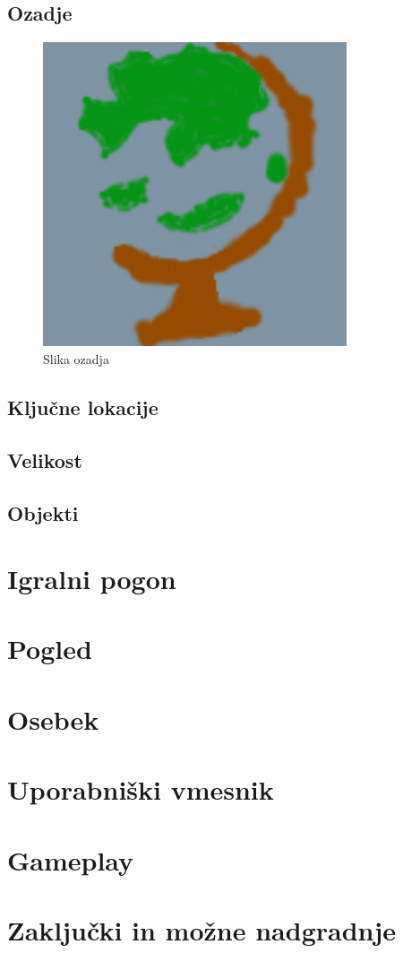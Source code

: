 \documentclass[a4paper,12pt]{article}
\begin{document}
\subsection{Ozadje}
\begin{figure}[h!]
    \centering
    \includegraphics[width=0.8\textwidth]{./slika.png}
    \caption{Slika ozadja}
    \label{fig:ozadje}
\end{figure}

\subsection{Klju\v{c}ne lokacije}

\subsection{Velikost}

\subsection{Objekti}

\section{Igralni pogon}

\section{Pogled}

\section{Osebek}

\section{Uporabni\v{s}ki vmesnik}

\section{Gameplay}

\section{Zaklju\v{c}ki in mo\v{z}ne nadgradnje}
\end{document}
